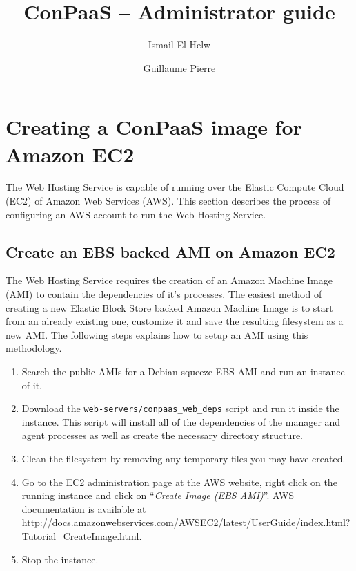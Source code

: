\documentclass[10pt]{article}
\begin{document}
\title{ConPaaS -- Administrator guide}
\author{Ismail El Helw \and Guillaume Pierre}
\maketitle

\vfil
\tableofcontents
\vfil
\newpage

\section{Creating a ConPaaS image for Amazon EC2}

The Web Hosting Service is capable of running over the Elastic Compute
Cloud (EC2) of Amazon Web Services (AWS). This section describes the
process of configuring an AWS account to run the Web Hosting Service.

\subsection{Create an EBS backed AMI on Amazon EC2}

The Web Hosting Service requires the creation of an Amazon Machine
Image (AMI) to contain the dependencies of it's processes.  The
easiest method of creating a new Elastic Block Store backed Amazon
Machine Image is to start from an already existing one, customize it
and save the resulting filesystem as a new AMI. The following steps
explains how to setup an AMI using this methodology.

\begin{enumerate}
\item Search the public AMIs for a Debian squeeze EBS AMI and run an
  instance of it.

\item Download the \verb+web-servers/conpaas_web_deps+ script and run
  it inside the instance. This script will install all of the
  dependencies of the manager and agent processes as well as create
  the necessary directory structure.

\item Clean the filesystem by removing any temporary files you may
  have created.

\item Go to the EC2 administration page at the AWS website, right
  click on the running instance and click on ``\emph{Create Image (EBS
    AMI)}''.  AWS documentation is available at
  \url{http://docs.amazonwebservices.com/AWSEC2/latest/UserGuide/index.html?Tutorial_CreateImage.html}.

\item Stop the instance.
\end{enumerate}
\end{document}
